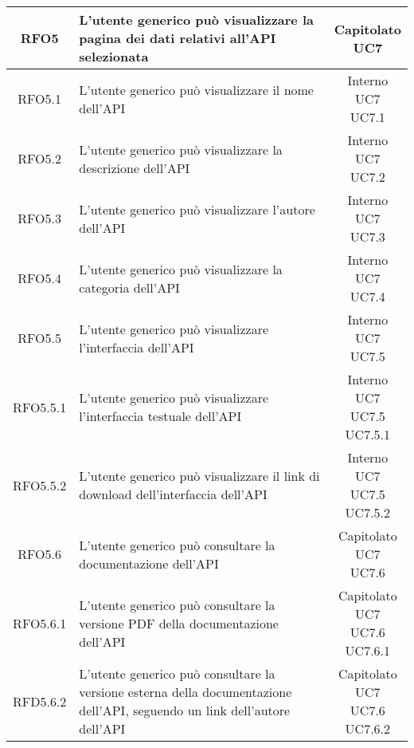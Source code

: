 \begin{longtable}{|c|p{8cm}|c|}
\hypertarget{RFO5}{RFO5} & L'utente generico può visualizzare la pagina dei dati relativi all'API selezionata & \makecell*{Capitolato\\UC7} \\
\hline

\hypertarget{RFO5.1}{RFO5.1} & L'utente generico può visualizzare il nome dell'API & \makecell*{Interno\\UC7\\UC7.1} \\
\hline
\hypertarget{RFO5.2}{RFO5.2} & L'utente generico può visualizzare la descrizione dell'API & \makecell*{Interno\\UC7\\UC7.2} \\
\hline
\hypertarget{RFO5.3}{RFO5.3} & L'utente generico può visualizzare l'autore dell'API & \makecell*{Interno\\UC7\\UC7.3} \\
\hline
\hypertarget{RFO5.4}{RFO5.4} & L'utente generico può visualizzare la categoria dell'API & \makecell*{Interno\\UC7\\UC7.4} \\
\hline

\hypertarget{RFO5.5}{RFO5.5} & L'utente generico può visualizzare l'interfaccia dell'API & \makecell*{Interno\\UC7\\UC7.5} \\
\hline
\hypertarget{RFO5.5.1}{RFO5.5.1} & L'utente generico può visualizzare l'interfaccia testuale dell'API & \makecell*{Interno\\UC7\\UC7.5\\UC7.5.1} \\
\hline
\hypertarget{RFO5.5.2}{RFO5.5.2} & L'utente generico può visualizzare il link di download dell'interfaccia dell'API & \makecell*{Interno\\UC7\\UC7.5\\UC7.5.2} \\
\hline

\hypertarget{RFO5.6}{RFO5.6} & L'utente generico può consultare la documentazione dell'API & \makecell*{Capitolato\\UC7\\UC7.6} \\
\hline
\hypertarget{RFO5.6.1}{RFO5.6.1} & L'utente generico può consultare la versione PDF della documentazione dell'API & \makecell*{Capitolato\\UC7\\UC7.6\\UC7.6.1} \\
\hline
\hypertarget{RFD5.6.2}{RFD5.6.2} & L'utente generico può consultare la versione esterna della documentazione dell'API, seguendo un link dell'autore dell'API  & \makecell*{Capitolato\\UC7\\UC7.6\\UC7.6.2} \\
\hline


\end{longtable}
